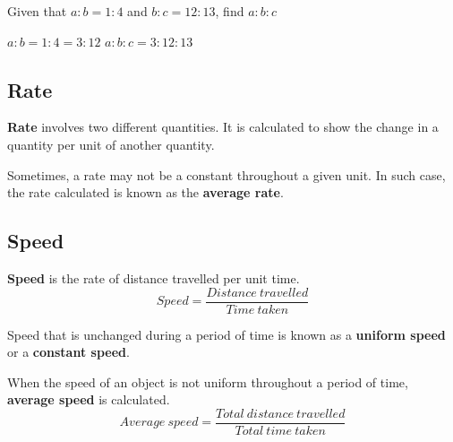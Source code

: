 \documentclass[../main]{subfiles}
\begin{document}
Given that \(a:b=1:4\) and \(b:c=12:13\), find \(a:b:c\)

\(a:b=1:4 = 3:12\)
\(a:b:c=3:12:13\)

\subsection{Rate}
\textbf{Rate} involves two different quantities. It is calculated to show the
change in a quantity per unit of another quantity.

Sometimes, a rate may not be a constant throughout a given unit. In such case,
the rate calculated is known as the \textbf{average rate}.

\subsection{Speed}
\textbf{Speed} is the rate of distance travelled per unit time.
\[Speed = {\frac {Distance\ travelled} {Time\ taken}}\]


Speed that is unchanged during a period of time is known as a \textbf{uniform
  speed} or a \textbf{constant speed}.

When the speed of an object is not uniform throughout a period of time,
\textbf{average speed} is calculated.
\[Average\ speed={\frac {Total\ distance\ travelled} {Total \ time \ taken}}\]
\end{document}
